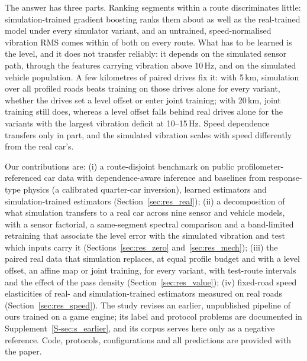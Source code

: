The answer has three parts.
Ranking segments within a route discriminates little: simulation-trained gradient boosting ranks them about as well as the real-trained model under every simulator variant, and an untrained, speed-normalised vibration RMS comes within \rpAbsMax{} of both on every route.
What has to be learned is the level, and it does not transfer reliably: it depends on the simulated sensor path, through the features carrying vibration above 10\,Hz, and on the simulated vehicle population.
A few kilometres of paired drives fix it: with 5\,km, simulation over all profiled roads beats training on those drives alone for every variant, whether the drives set a level offset or enter joint training; with 20\,km, joint training still does, whereas a level offset falls behind real drives alone for the variants with the largest vibration deficit at 10--15\,Hz.
Speed dependence transfers only in part, and the simulated vibration scales with speed differently from the real car's.

Our contributions are:
(i) a route-disjoint benchmark on public profilometer-referenced car data with dependence-aware inference and baselines from response-type physics (a calibrated quarter-car inversion), learned estimators and simulation-trained estimators (Section~\ref{sec:res_real});
(ii) a decomposition of what simulation transfers to a real car across nine sensor and vehicle models, with a sensor factorial, a same-segment spectral comparison and a band-limited retraining that associate the level error with the simulated vibration and test which inputs carry it (Sections~\ref{sec:res_zero} and~\ref{sec:res_mech});
(iii) the paired real data that simulation replaces, at equal profile budget and with a level offset, an affine map or joint training, for every variant, with test-route intervals and the effect of the pass density (Section~\ref{sec:res_value});
(iv) fixed-road speed elasticities of real- and simulation-trained estimators measured on real roads (Section~\ref{sec:res_speed}).
The study revises an earlier, unpublished pipeline of ours trained on a game engine; its label and protocol problems are documented in Supplement~\ref{S-sec:s_earlier}, and its corpus serves here only as a negative reference.
Code, protocols, configurations and all predictions are provided with the paper.
